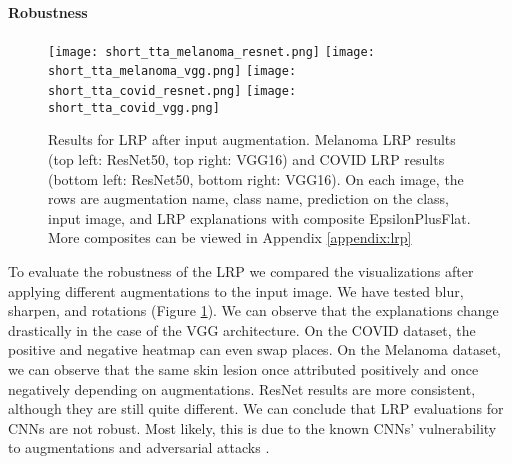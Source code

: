 \documentclass[twoside,11pt]{article}
\begin{document}
\paragraph{Robustness}
\begin{figure}[t]
    \centering
    \texttt{[image: short\_tta\_melanoma\_resnet.png]}
    \texttt{[image: short\_tta\_melanoma\_vgg.png]}
    \texttt{[image: short\_tta\_covid\_resnet.png]}
    \texttt{[image: short\_tta\_covid\_vgg.png]}
    \caption{
    Results for LRP after input augmentation.
    Melanoma LRP results (top left: ResNet50, top right: VGG16) and COVID LRP results (bottom left: ResNet50, bottom right: VGG16).
    On each image, the rows are augmentation name, class name, prediction on the class, input image, and LRP explanations with composite EpsilonPlusFlat.
    More composites can be viewed in Appendix \ref{appendix:lrp}
    }
    \label{fig:lrp_tta}
\end{figure}

To evaluate the robustness of the LRP we compared the visualizations after applying different augmentations to the input image. We have tested blur, sharpen, and rotations (Figure \ref{fig:lrp_tta}).
We can observe that the explanations change drastically in the case of the VGG architecture.
On the COVID dataset, the positive and negative heatmap can even swap places.
On the Melanoma dataset, we can observe that the same skin lesion once attributed positively and once negatively depending on augmentations.
ResNet results are more consistent, although they are still quite different.
We can conclude that LRP evaluations for CNNs are not robust.
Most likely, this is due to the known CNNs' vulnerability to augmentations and adversarial attacks \citep{pgd_madry}.

\end{document}
